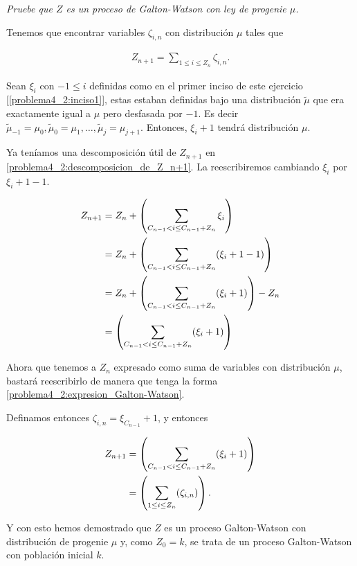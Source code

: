 \emph{
	Pruebe que $Z$ es un proceso de Galton-Watson con ley de progenie $\mu$.
}

\afterstatement\pn

Tenemos que encontrar variables $\zeta_{i,n}$ con distribución $\mu$ tales que

\begin{align}
    Z_{n+1} =   \sum_{1 \leq i \leq Z_n} \zeta_{i,n}. \label{problema4_2:expresion_Galton-Watson}
\end{align}

Sean $\xi_{i}$ con $-1 \leq i$ definidas como en el primer inciso de este ejercicio [\ref{problema4_2:inciso1}],
estas estaban definidas bajo una distribución $\tilde\mu$ que era exactamente igual a $\mu$ pero desfasada por $-1$.
Es decir $\tilde\mu_{-1} = \mu_{0}, \tilde\mu_{0} = \mu_{1}, \dots, \tilde\mu_{j} = \mu_{j+1}$. Entonces, 
$\xi_{i} + 1$ tendrá distribución $\mu$.\pn

Ya teníamos una descomposición útil de $Z_{n+1}$ en \eqref{problema4_2:descomposicion_de_Z_n+1}. La reescribiremos cambiando $\xi_{i}$
por $\xi_{i} + 1 - 1$.

\begin{align}
    Z_{n+1} &=  Z_n + \left( \sum_{C_{n-1} < i \leq  C_{n-1} + Z_{n}} \xi_i\right)                 \\
            &=  Z_n + \left( \sum_{C_{n-1} < i \leq  C_{n-1} + Z_{n}} (\xi_i + 1 - 1)\right)       \\
            &=  Z_n + \left( \sum_{C_{n-1} < i \leq  C_{n-1} + Z_{n}} (\xi_i + 1)\right)  - Z_n    \\
            &=  \left( \sum_{C_{n-1} < i \leq  C_{n-1} + Z_{n}} (\xi_i + 1)\right)                 
\end{align}

Ahora que tenemos a $Z_{n}$ expresado como suma de variables con distribución $\mu$, bastará reescribirlo de manera que
tenga la forma \eqref{problema4_2:expresion_Galton-Watson}.\pn

Definamos entonces $\zeta_{i, n} = \xi_{C_{n-1}} + 1$, y entonces

\begin{align}
    Z_{n+1} &=  \left( \sum_{C_{n-1} < i \leq  C_{n-1} + Z_{n}} (\xi_i + 1)\right)     \\
            &=  \left( \sum_{1 \leq i \leq Z_{n}} (\zeta_{i, n})\right) .
\end{align}

Y con esto hemos demostrado que $Z$ es un proceso Galton-Watson con distribución de progenie $\mu$ y, como $Z_0 = k$, se trata
de un proceso Galton-Watson con población inicial $k$.